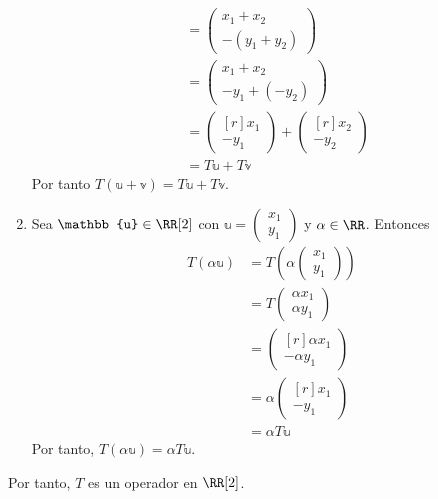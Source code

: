 \begin{examplebox}{}{}
\begin{enumerate}[label=\roman*), topsep=6pt, itemsep=0pt]
\begin{align*}
            & = \begin{pmatrix}
                x_1 + x_2 \\
                -(y_1 + y_2)
            \end{pmatrix} \\
            & = \begin{pmatrix}
                x_1 + x_2 \\
                -y_1 + (-y_2)
            \end{pmatrix} \\
            & = \begin{pmatrix*}[r]
                x_1 \\
                -y_1
            \end{pmatrix*} + \begin{pmatrix*}[r]
                x_2 \\
                -y_2
            \end{pmatrix*} \\
            & = T\mathbb{u} + T\mathbb{v}
        \end{align*}
        Por tanto $T(\mathbb{u} + \mathbb{v}) = T\mathbb{u} + T\mathbb{v}$.
        \item Sea $\mathbb{u} \in \RR[2]$ con $\mathbb{u} = \begin{pmatrix}
            x_1 \\
            y_1
        \end{pmatrix}$ y $\alpha \in \RR$. Entonces
        \begin{align*}
            T(\alpha \mathbb{u}) & = T \left( \alpha \begin{pmatrix}
                x_1 \\
                y_1
            \end{pmatrix} \right) \\
            & = T \begin{pmatrix}
                \alpha x_1 \\
                \alpha y_1
            \end{pmatrix} \\
            & = \begin{pmatrix*}[r]
                \alpha x_1 \\
                - \alpha y_1
            \end{pmatrix*} \\
            & = \alpha \begin{pmatrix*}[r]
                x_1 \\
                -y_1
            \end{pmatrix*} \\
            & = \alpha T \mathbb{u}
        \end{align*}
        Por tanto, $T(\alpha \mathbb{u}) = \alpha T\mathbb{u}$.
    \end{enumerate}
    Por tanto, $T$ es un operador en $\RR[2]$.
\end{examplebox}

